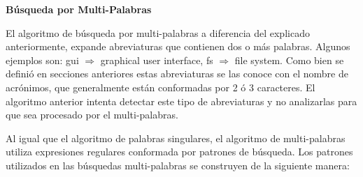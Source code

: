 \pagebreak
\noindent \textbf{Búsqueda por Multi-Palabras\\}

El algoritmo de búsqueda por multi-palabras a diferencia del explicado anteriormente, expande abreviaturas que contienen dos o más palabras. Algunos ejemplos son: \textsf{gui $\Rightarrow$ graphical user interface, fs $\Rightarrow$ file system}. Como bien se definió en secciones anteriores estas abreviaturas se las conoce con el nombre de acrónimos, que generalmente están conformadas por 2 ó 3 caracteres. El algoritmo anterior intenta detectar este tipo de abreviaturas y no analizarlas para que sea procesado por el multi-palabras.

Al igual que el algoritmo de palabras singulares, el algoritmo de multi-palabras utiliza expresiones regulares conformada por patrones de búsqueda. Los patrones utilizados en las búsquedas multi-palabras se construyen de la siguiente manera:





